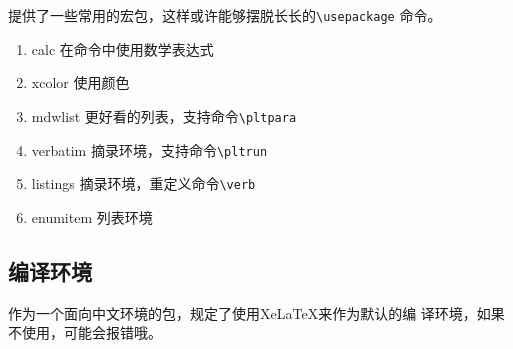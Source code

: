 \documentclass{peterlitsdoc}
\newcommand{\vb}{\verb}
\begin{document}
提供了一些常用的宏包，这样或许能够摆脱长长的\vb|\usepackage|
命令。

\begin{enumerate}
    \item calc          \hfill 在命令中使用数学表达式
    \item xcolor        \hfill 使用颜色
    \item mdwlist
          \hfill 更好看的列表，支持命令\vb|\pltpara|
    \item verbatim      \hfill 摘录环境，支持命令\vb|\pltrun|
    \item listings      \hfill 摘录环境，重定义命令\verb|\verb|
    \item enumitem      \hfill 列表环境
\end{enumerate}


\subsection{编译环境}

作为一个面向中文环境的包，规定了使用XeLaTeX来作为默认的编
译环境，如果不使用，可能会报错哦。


\end{document}
